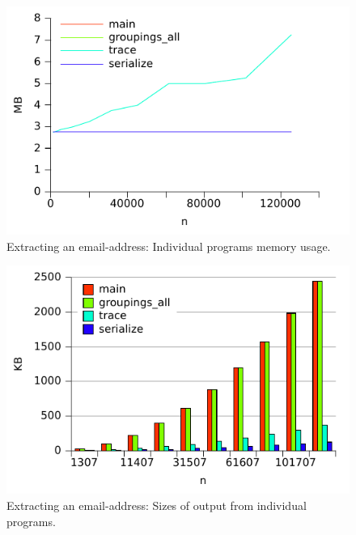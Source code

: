 \begin{figure}
\centering
\includegraphics{benchmarks/memory/email_mem_individual.pdf}
\caption{Extracting an email-address: Individual programs memory usage.}
\label{fig:email_individual_mem}
\end{figure}

\begin{figure}
\centering
\includegraphics{benchmarks/memory/email_mbvsize.pdf}
\caption{Extracting an email-address: Sizes of output from individual
  programs.}
\label{fig:email_mbvsize}
\end{figure}


